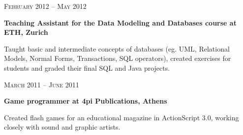 \documentclass[10pt]{article} %
\begin{document}
\begin{minipage}[t]{0.5\textwidth}

{\raggedleft\textsc{February 2012 -- May 2012}\par}

{\raggedright\large \textbf{Teaching Assistant for the Data Modeling and Databases course at ETH, Zurich}\\}

\normalsize{Taught basic and intermediate concepts of databases (eg. UML, Relational Models, Normal Forms, Transactions, SQL operators), created exercises for students and graded their final SQL and Java projects.}\\


{\raggedleft\textsc{March 2011 -- June 2011}\par}

{\raggedright\large \textbf{Game programmer at 4pi Publications, Athens}\\}

\normalsize{Created flash games for an educational magazine in ActionScript 3.0, working closely with sound and graphic artists.}\\


	

\end{minipage} %
\hfill
\end{document}
